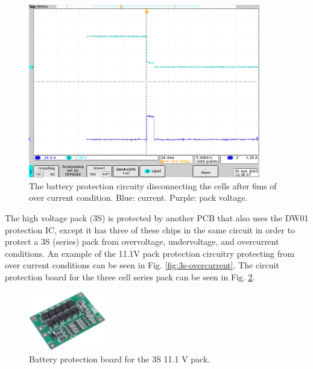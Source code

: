 \documentclass{article}
\begin{document}
\begin{figure}[H]
	\centering
	\includegraphics[width=0.9\textwidth]{images/over-current.png}
	\caption{The battery protection circuity disconnecting the cells after 6ms of over current condition. Blue: current. Purple: pack voltage.}
	\label{fig:over-current}
\end{figure}


The high voltage pack (3S) is protected by another PCB that also uses the DW01 protection IC, except it has three of these chips in the same circuit in order to protect a 3S (series) pack from overvoltage, undervoltage, and overcurrent conditions. An example of the 11.1V pack protection circuitry protecting from over current conditions can be seen in Fig. \ref{fig:3s-overcurrent}. The circuit protection board for the three cell series pack can be seen in Fig. \ref{fig:3s-protect}.


\begin{figure}
\centering
\includegraphics[width=0.3\textwidth]{images/3sProtection}
\caption{Battery protection board for the 3S 11.1 V pack.}
\label{fig:3s-protect}
\end{figure}
\end{document}
